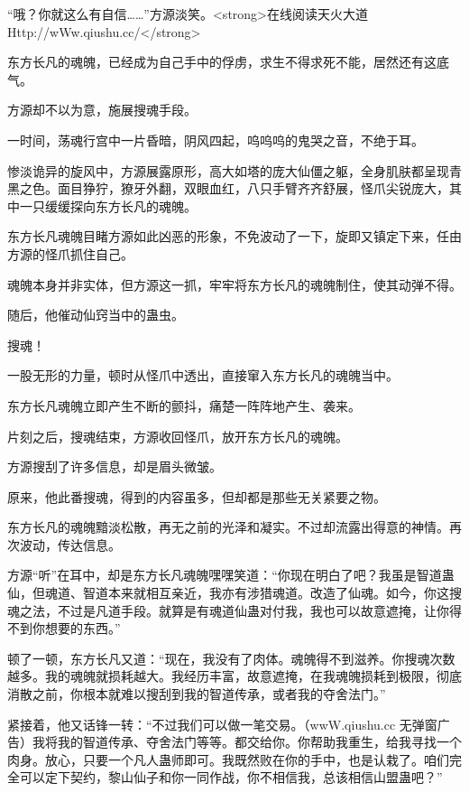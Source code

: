 
\begin{this_body}

“哦？你就这么有自信……”方源淡笑。<strong>在线阅读天火大道Http://wWw.qiushu.cc/</strong>

东方长凡的魂魄，已经成为自己手中的俘虏，求生不得求死不能，居然还有这底气。

方源却不以为意，施展搜魂手段。

一时间，荡魂行宫中一片昏暗，阴风四起，呜呜呜的鬼哭之音，不绝于耳。

惨淡诡异的旋风中，方源展露原形，高大如塔的庞大仙僵之躯，全身肌肤都呈现青黑之色。面目狰狞，獠牙外翻，双眼血红，八只手臂齐齐舒展，怪爪尖锐庞大，其中一只缓缓探向东方长凡的魂魄。

东方长凡魂魄目睹方源如此凶恶的形象，不免波动了一下，旋即又镇定下来，任由方源的怪爪抓住自己。

魂魄本身并非实体，但方源这一抓，牢牢将东方长凡的魂魄制住，使其动弹不得。

随后，他催动仙窍当中的蛊虫。

搜魂！

一股无形的力量，顿时从怪爪中透出，直接窜入东方长凡的魂魄当中。

东方长凡魂魄立即产生不断的颤抖，痛楚一阵阵地产生、袭来。

片刻之后，搜魂结束，方源收回怪爪，放开东方长凡的魂魄。

方源搜刮了许多信息，却是眉头微皱。

原来，他此番搜魂，得到的内容虽多，但却都是那些无关紧要之物。

东方长凡的魂魄黯淡松散，再无之前的光泽和凝实。不过却流露出得意的神情。再次波动，传达信息。

方源“听”在耳中，却是东方长凡魂魄嘿嘿笑道：“你现在明白了吧？我虽是智道蛊仙，但魂道、智道本来就相互亲近，我亦有涉猎魂道。改造了仙魂。如今，你这搜魂之法，不过是凡道手段。就算是有魂道仙蛊对付我，我也可以故意遮掩，让你得不到你想要的东西。”

顿了一顿，东方长凡又道：“现在，我没有了肉体。魂魄得不到滋养。你搜魂次数越多。我的魂魄就损耗越大。我经历丰富，故意遮掩，在我魂魄损耗到极限，彻底消散之前，你根本就难以搜刮到我的智道传承，或者我的夺舍法门。”

紧接着，他又话锋一转：“不过我们可以做一笔交易。（wwW.qiushu.cc 无弹窗广告）我将我的智道传承、夺舍法门等等。都交给你。你帮助我重生，给我寻找一个肉身。放心，只要一个凡人蛊师即可。我既然败在你的手中，也是认栽了。咱们完全可以定下契约，黎山仙子和你一同作战，你不相信我，总该相信山盟蛊吧？”


\end{this_body}
